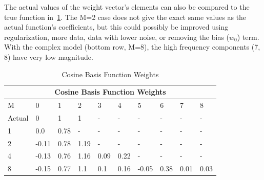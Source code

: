 The actual values of the weight vector's elements can also be compared to the true function in~\cref{table:w}.
The M=2 case does not give the exact same values as the actual function's coefficients, but this could possibly be improved using regularization, more data, data with lower noise, or removing the bias ($w_0$) term.
With the complex model (bottom row, M=8), the high frequency components (7, 8) have very low magnitude.

\begin{table}[t]
  \centering
  \caption[]{Cosine Basis Function Weights}
	\begin{tabular}{|p{1cm}||p{1cm}|p{1cm}|p{1cm}|p{1cm}|p{1cm}|p{1cm}|p{1cm}|p{1cm}|p{1cm}|}
	 \hline
	 \multicolumn{10}{|c|}{Cosine Basis Function Weights} \\
	 \hline
	 M & 0 & 1 & 2 & 3 & 4 & 5 & 6 & 7 & 8 \\
	 \hline\hline
	 Actual & 0 & 1 & 1 & - & - & - & - & - & - \\
	 1 & 0.0 & 0.78 & - & - & - & - & - & - & - \\
	 2 & -0.11 & 0.78 & 1.19 & - & - & - & - & - & - \\
	 4 & -0.13 & 0.76 & 1.16 & 0.09 & 0.22 & - & - & - & - \\
	 8 & -0.15 & 0.77 & 1.1 & 0.1 & 0.16 & -0.05 & 0.38 & 0.01 & 0.03  \\
	 \hline
	\end{tabular}
	\label{table:w}
\end{table}

